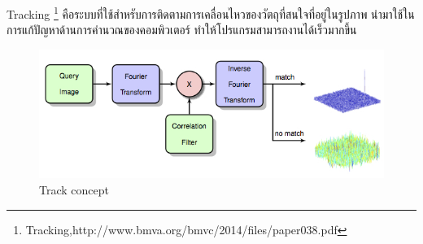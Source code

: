 Tracking \footnote{Tracking,http://www.bmva.org/bmvc/2014/files/paper038.pdf} คือระบบที่ใช้สำหรับการติดตามการเคลื่อนไหวของวัตถุที่สนใจที่อยู่ในรูปภาพ นำมาใช้ในการแก้ปัญหาด้านการคำนวณของคอมพิวเตอร์ ทำให้โปรแกรมสามารถงานได้เร็วมากขึ้น

\begin{figure}[!ht]
	\centering
	\includegraphics[width=1\textwidth]{chapter2/images/track-concept.png}
		\caption{Track concept}
    	\label{fig:Track concept}
\end{figure}

